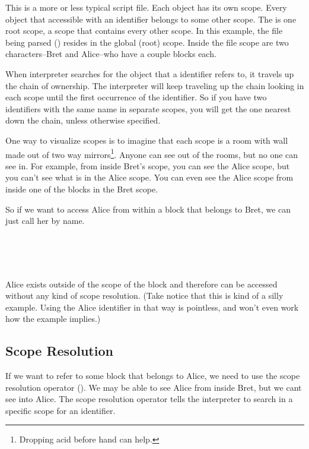 This is a more or less typical script file.  Each object has its own scope.  Every object that accessible with an identifier belongs to some other scope.  The is one root scope, a scope that contains every other scope.  In this example, the file being parsed () resides in the global (root) scope.  Inside the file scope are two characters--Bret and Alice--who have a couple blocks each.

When interpreter searches for the object that a identifier refers to, it travels up the chain of ownership.  The interpreter will keep traveling up the chain looking in each scope until the first occurrence of the identifier.  So if you have two identifiers with the same name in separate scopes, you will get the one nearest down the chain, unless otherwise specified.

One way to visualize scopes is to imagine that each scope is a room with wall made out of two way mirrors\footnote{Dropping acid before hand can help.}.  Anyone can see out of the rooms, but no one can see in.  For example, from inside Bret's scope, you can see the Alice scope, but you can't see what is in the Alice scope.  You can even see the Alice scope from inside one of the blocks in the Bret scope.

So if we want to access Alice from within a block that belongs to Bret, we can just call her by name.

\begin{SSCodeBox}
\scitea{\{} \\
\scitea{\hspace*{4em}}
\scitea{ =} \\
\scitea{\hspace*{4em}}
\scitea{;} \\
\scitea{\}}
\end{SSCodeBox}

Alice exists outside of the scope of the block and therefore can be accessed without any kind of scope resolution.  (Take notice that this is kind of a silly example.  Using the Alice identifier in that way is pointless, and won't even work how the example implies.)

\subsection{Scope Resolution}

If we want to refer to some block that belongs to Alice, we need to use the scope resolution operator (\SSCode{:}).  We may be able to see Alice from inside Bret, but we cant see into Alice.  The scope resolution operator tells the interpreter to search in a specific scope for an identifier.

